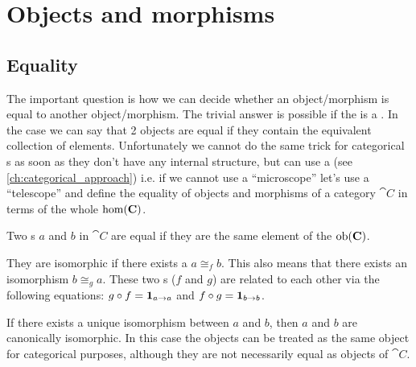 \chapter{Objects and morphisms}

\section{Equality}

The important question is how we can decide whether an
object/morphism is equal to another object/morphism. The trivial
answer is possible if the  is a
. In the case we can say that 2 objects are equal
if they contain the equivalent collection of elements. Unfortunately
we cannot do the same trick for categorical s as
soon as they don't have any internal 
structure, but can use a  (see \cref{ch:categorical_approach}) i.e. if we cannot use a ``microscope'' let's
use a ``telescope'' and define the equality of objects and morphisms of
a category $\cat{C}$ in terms of the whole $\mathrm{hom}(\mathbf{C})$.

\begin{definition}
\label{def:object_equality}
Two s $a$ and $b$ in 
$\cat{C}$ are equal if they are the same element of the
 $\mathrm{ob}(\mathbf{C})$.

They are isomorphic if there exists a 
$a \cong_f b$. This also means that there exists an isomorphism
$b \cong_g a$. These two s ($f$ and $g$) are
related to each other via the following equations:
$g \circ f = \mathbf{1}_{ a \to a }$ and $f \circ g = \mathbf{1}_{ b \to b }$.

If there exists a unique isomorphism between $a$ and $b$, then $a$ and
$b$ are canonically isomorphic. In this case the objects can be treated
as the same object for categorical purposes, although they are not
necessarily equal as objects of $\cat{C}$.
\end{definition}

